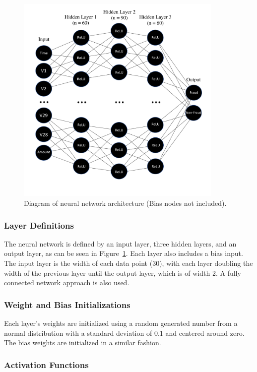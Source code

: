 \documentclass{article}
\begin{document}
\begin{figure}
  \begin{center}
    \includegraphics[width=100mm]{NeuralNetDiagramPDF.pdf}
    \caption{Diagram of neural network architecture (Bias nodes not included).}
    \label{network-architecture}
  \end{center}
\end{figure}

 \subsubsection{Layer Definitions}

 The neural network is defined by an input layer, three hidden layers, and an output layer, as can 
 be seen in Figure~\ref{network-architecture}. Each layer also includes a bias input. The input layer is the 
 width of each data point (30), with each layer doubling the width of the previous layer until the 
 output layer, which is of width 2. A fully connected network approach is also used.

\subsubsection{Weight and Bias Initializations}

 Each layer’s weights are initialized using a random generated number from a normal distribution 
 with a standard deviation of  0.1 and centered around zero. The bias weights are initialized in a 
 similar fashion.

\subsubsection{Activation Functions}
\end{document}
